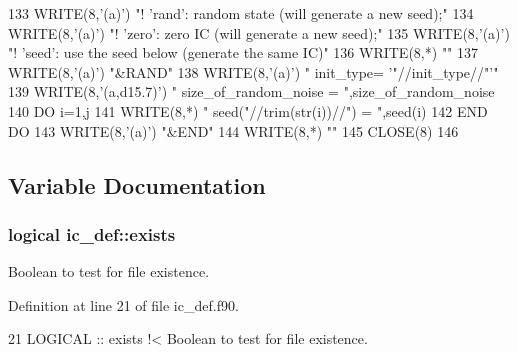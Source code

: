 \begin{DoxyCode}
133     \textcolor{keyword}{WRITE}(8,\textcolor{stringliteral}{'(a)'}) \textcolor{stringliteral}{"!        'rand': random state (will generate a new seed);"}
134     \textcolor{keyword}{WRITE}(8,\textcolor{stringliteral}{'(a)'}) \textcolor{stringliteral}{"!        'zero': zero IC (will generate a new seed);"}
135     \textcolor{keyword}{WRITE}(8,\textcolor{stringliteral}{'(a)'}) \textcolor{stringliteral}{"!        'seed': use the seed below (generate the same IC)"}
136     \textcolor{keyword}{WRITE}(8,*) \textcolor{stringliteral}{""}
137     \textcolor{keyword}{WRITE}(8,\textcolor{stringliteral}{'(a)'}) \textcolor{stringliteral}{"&RAND"}
138     \textcolor{keyword}{WRITE}(8,\textcolor{stringliteral}{'(a)'}) \textcolor{stringliteral}{"  init\_type= '"}//init\_type//\textcolor{stringliteral}{"'"} 
139     \textcolor{keyword}{WRITE}(8,\textcolor{stringliteral}{'(a,d15.7)'}) \textcolor{stringliteral}{"  size\_of\_random\_noise = "},size\_of\_random\_noise
140     \textcolor{keywordflow}{DO} i=1,j
141        \textcolor{keyword}{WRITE}(8,*) \textcolor{stringliteral}{" seed("}//trim(str(i))//\textcolor{stringliteral}{") = "},seed(i)
142 \textcolor{keywordflow}{    END DO}
143     \textcolor{keyword}{WRITE}(8,\textcolor{stringliteral}{'(a)'}) \textcolor{stringliteral}{"&END"}
144     \textcolor{keyword}{WRITE}(8,*) \textcolor{stringliteral}{""}
145     \textcolor{keyword}{CLOSE}(8)
146     
\end{DoxyCode}


\subsection{Variable Documentation}
\subsubsection[{\texorpdfstring{exists}{exists}}]{\setlength{\rightskip}{0pt plus 5cm}logical ic\+\_\+def\+::exists\hspace{0.3cm}{\ttfamily [private]}}\hypertarget{namespaceic__def_a989b031664e87b1a693a329ecd4f4721}{}\label{namespaceic__def_a989b031664e87b1a693a329ecd4f4721}


Boolean to test for file existence. 



Definition at line 21 of file ic\+\_\+def.\+f90.


\begin{DoxyCode}
21   \textcolor{keywordtype}{LOGICAL} :: exists\textcolor{comment}{ !< Boolean to test for file existence.}
\end{DoxyCode}
